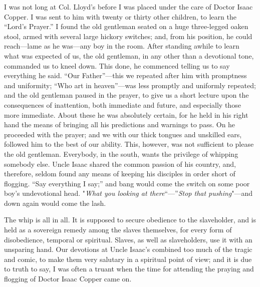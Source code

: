 I was not long at Col. Lloyd's before I was placed under the care of
Doctor Isaac Copper. I was sent to him with twenty or thirty other
children, to learn the ``Lord's Prayer.'' I found the old gentleman
seated on a huge three-legged oaken stool, armed with several large
hickory switches; and, from his position, he could reach---lame as he
was---any boy in the room. After standing awhile to learn what was
expected of us, the old gentleman, in any other than a devotional tone,
commanded us to kneel down. This done, he commenced telling us to say
everything he said. ``Our Father''---this we repeated after him with
promptness and uniformity; ``Who art in heaven''---was less promptly and
uniformly repeated; and the old gentleman paused in the prayer, to give
us a short lecture upon the consequences of inattention, both immediate
and future, and especially those more immediate. About these he was
absolutely certain, for he held in his right hand the means of
{\protect\hypertarget{72}{}{}}bringing all his predictions and warnings
to pass. On he proceeded with the prayer; and we with our thick tongues
and unskilled ears, followed him to the best of our ability. This,
however, was not sufficient to please the old gentleman. Everybody, in
the south, wants the privilege of whipping somebody else. Uncle Isaac
shared the common passion of his country, and, therefore, seldom found
any means of keeping his disciples in order short of flogging. ``Say
everything I say;'' and bang would come the switch on some poor boy's
undevotional head. "\emph{What you looking at there}``---''\emph{Stop
that pushing}"---and down again would come the lash.

The whip is all in all. It is supposed to secure obedience to the
slaveholder, and is held as a sovereign remedy among the slaves
themselves, for every form of disobedience, temporal or spiritual.
Slaves, as well as slaveholders, use it with an unsparing hand. Our
devotions at Uncle Isaac's combined too much of the tragic and comic, to
make them very salutary in a spiritual point of view; and it is due to
truth to say, I was often a truant when the time for attending the
praying and flogging of Doctor Isaac Copper came on.

